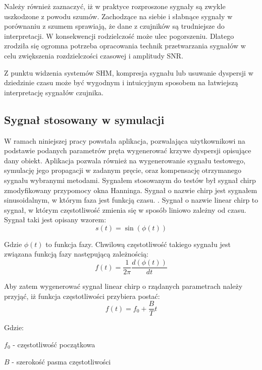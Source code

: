 Należy również zaznaczyć, iż w praktyce rozproszone sygnały są zwykle uszkodzone z powodu szumów. Zachodzące na siebie i słabnące sygnały w porównaniu z szumem sprawiają, że dane z czujników są trudniejsze do interpretacji. W konsekwencji rodzielczość może ulec pogorszeniu. Dlatego zrodziła się ogromna potrzeba opracowania technik przetwarzania sygnałów w celu zwiększenia rozdzielczości czasowej i amplitudy SNR.

Z punktu widzenia systemów SHM, kompresja sygnału lub usuwanie dyspersji w dziedzinie czasu może być wygodnym i intuicyjnym sposobem na łatwiejszą interpretację sygnałów czujnika.

\subsection{Sygnał stosowany w symulacji}
W ramach niniejszej pracy powstała aplikacja, pozwalająca użytkownikowi na podstawie podanych parametrów pręta wygenerować krzywe dyspersji opisujące dany obiekt. Aplikacja pozwala również na wygenerowanie sygnału testowego, symulację jego propagacji w zadanym pręcie, oraz kompensację otrzymanego sygnału wybranymi metodami. Sygnałem stosowanym do testów był sygnał chirp zmodyfikowany przypomocy okna Hanninga.
	Sygnał o nazwie chirp jest sygnałem sinusoidalnym, w którym faza jest funkcją czasu. \cite{kasia3}. Sygnał o nazwie linear chirp to sygnał, w którym częstotliwość zmienia się w sposób liniowo zależny od czasu. Sygnał taki jest opisany wzorem:
	\begin{equation}
	s(t) = \sin(\phi (t))
	\end{equation}
	
	Gdzie $\phi (t)$ to funkcja fazy. Chwilową częstotliwość takiego sygnału jest związana funkcją fazy następującą zależnością:
	\begin{equation}
	f(t) = \frac{1}{2\pi}\frac{d(\phi (t))}{dt} \label{eq:f(t)_z_phi}
	\end{equation}
	
	Aby zatem wygenerować sygnał linear chirp o rządanych parametrach należy przyjąć, iż funkcja częstotliwości przybiera postać:
	\begin{equation}
	f(t) = f_0+\frac{B}{T}t \label{eq:f(t)_liniowo}
	\end{equation}
	
	Gdzie:
	
	$f_0$ - częstotliwość początkowa
	
	$B$ - szerokość pasma częstotliwości
	
